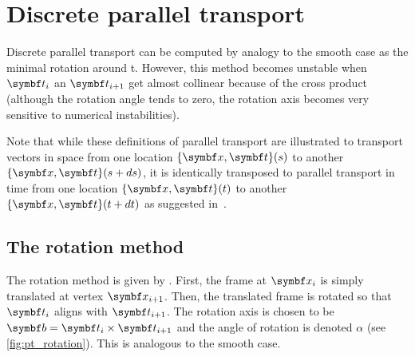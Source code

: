 \section{Discrete parallel transport}\label{sec=discrete_pt}

Discrete parallel transport can be computed by analogy to the smooth case as the minimal rotation around t. However, this method becomes unstable when $\vect{t}_i$ an $\vect{t}_{i+1}$ get almost collinear because of the cross product (although the rotation angle tends to zero, the rotation axis becomes very sensitive to numerical instabilities).

Note that while these definitions of parallel transport are illustrated to transport vectors in space from one location $\{\vect{x},\vect{t}\}(s)$ to another $\{\vect{x},\vect{t}\}(s + ds)$, it is identically transposed to parallel transport in time from one location $\{\vect{x},\vect{t}\}(t)$ to another $\{\vect{x},\vect{t}\}(t+dt)$ as suggested in~\cite{Bergou2010}.

\subsection{The rotation method}

The rotation method is given by . First, the frame at $\vect{x}_i$ is simply translated at vertex $\vect{x}_{i+1}$. Then, the translated frame is rotated so that $\vect{t}_i$ aligns with $\vect{t}_{i+1}$. The rotation axis is chosen to be $\vect{b} = \vect{t}_i \times \vect{t}_{i+1}$ and the angle of rotation is denoted $\alpha$ (see \cref{fig:pt_rotation}). This is analogous to the smooth case.




